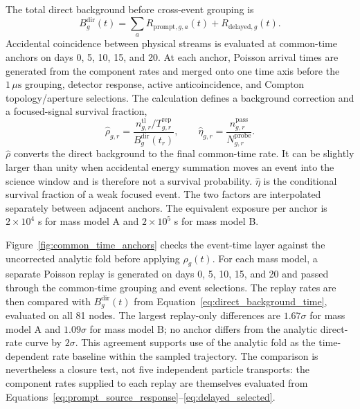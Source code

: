 \documentclass[11pt]{article}
\begin{document}
The total direct background before cross-event grouping is
\begin{equation}
 B^{\mathrm{dir}}_g(t)
 =\sum_aR_{\mathrm{prompt},g,a}(t)+R_{\mathrm{delayed},g}(t).
 \label{eq:direct_background_time}
\end{equation}
Accidental coincidence between physical streams is evaluated at common-time
anchors on days 0, 5, 10, 15, and 20. At each anchor, Poisson arrival times are
generated from the component rates and merged onto one time axis before the
$1\,\mu\mathrm{s}$ grouping, detector response, active anticoincidence, and
Compton topology/aperture selections. The calculation defines a background
correction and a focused-signal survival fraction,
\begin{equation}
 \widehat\rho_{g,r}=
 \frac{n^{\mathrm{tl}}_{g,r}/T^{\mathrm{rep}}_{g,r}}
 {B^{\mathrm{dir}}_g(t_r)},\qquad
 \widehat\eta_{g,r}=
 \frac{n^{\mathrm{pass}}_{g,r}}{N^{\mathrm{probe}}_{g,r}}.
 \label{eq:anchor_time_factors}
\end{equation}
$\widehat\rho$ converts the direct background to the final common-time rate.
It can be slightly larger than unity when accidental energy summation moves an
event into the science window and is therefore not a survival probability.
$\widehat\eta$ is the conditional survival fraction of a weak focused event.
The two factors are interpolated separately between adjacent anchors. The
equivalent exposure per anchor is $2\times10^4$ s for mass model A and
$2\times10^5$ s for mass model B.

Figure~\ref{fig:common_time_anchors} checks the event-time layer against the
uncorrected analytic fold before applying $\rho_g(t)$. For each mass model, a
separate Poisson replay is generated on days 0, 5, 10, 15, and 20 and passed
through the common-time grouping and event selections. The replay rates are
then compared with $B_g^{\mathrm{dir}}(t)$ from
Equation~\eqref{eq:direct_background_time}, evaluated on all 81 nodes. The
largest replay-only differences are $1.67\sigma$ for mass model A and
$1.09\sigma$ for mass model B; no anchor differs from the analytic direct-rate
curve by $2\sigma$. This agreement supports use of the analytic fold as the
time-dependent rate baseline within the sampled trajectory. The comparison is
nevertheless a closure test, not five independent particle transports: the
component rates supplied to each replay are themselves evaluated from
Equations~\eqref{eq:prompt_source_response}--\eqref{eq:delayed_selected}.
\end{document}

